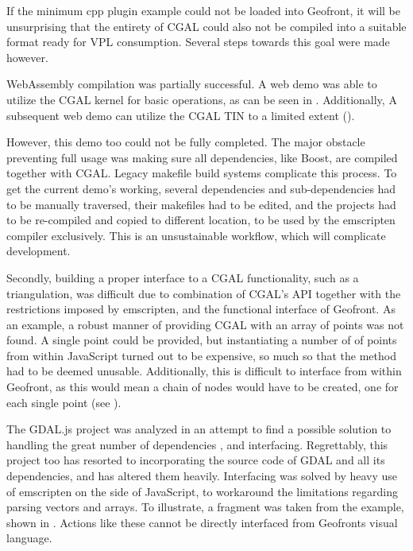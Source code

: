 If the minimum cpp plugin example could not be loaded into Geofront, it will be unsurprising that the entirety of CGAL could also not be compiled into a suitable format ready for VPL consumption.
Several steps towards this goal were made however.

WebAssembly compilation was partially successful.
A web demo was able to utilize the CGAL kernel for basic operations, as can be seen in . 
Additionally, A subsequent web demo can utilize the CGAL TIN to a limited extent ().

However, this demo too could not be fully completed. The major obstacle preventing full usage was making sure all dependencies, like Boost, are compiled together with CGAL.
Legacy makefile build systems complicate this process. 
To get the current demo's working, several dependencies and sub-dependencies had to be manually traversed, their makefiles had to be edited, and the projects had to be re-compiled and copied to different location, to be used by the emscripten compiler exclusively. 
This is an unsustainable workflow, which will complicate development.  

Secondly, building a proper interface to a CGAL functionality, such as a triangulation, was difficult due to combination of CGAL's API together with the restrictions imposed by emscripten, and the functional interface of Geofront. 
As an example, a robust manner of providing CGAL with an array of points was not found.
A single point could be provided, but instantiating a number of of points from within JavaScript turned out to be expensive, so much so that the method had to be deemed unusable. 
Additionally, this is difficult to interface from within Geofront, as this would mean a chain of nodes would have to be created, one for each single point (see ). 

The GDAL.js project was analyzed in an attempt to find a possible solution to handling the great number of dependencies \citep*{dohler_gdal_2022}, and interfacing. 
Regrettably, this project too has resorted to incorporating the source code of GDAL and all its dependencies, and has altered them heavily. 
Interfacing was solved by heavy use of emscripten on the side of JavaScript, to workaround the limitations regarding parsing vectors and arrays. 
To illustrate, a fragment was taken from the  example, shown in .
Actions like these cannot be directly interfaced from Geofronts visual language.

